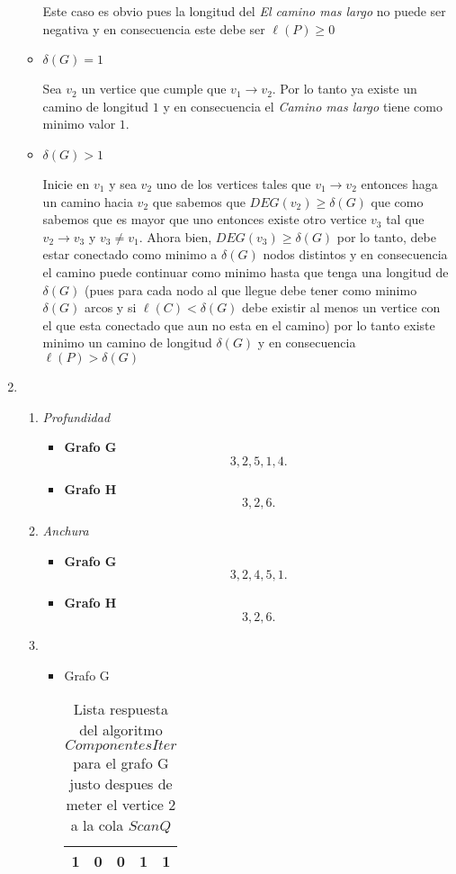 \begin{enumerate}
\begin{itemize}
	    Este caso es obvio pues la longitud del \textit{El camino mas largo} no puede ser negativa y en consecuencia este debe ser $\ell\left( P \right) \ge 0$

	  \item $\delta\left( G \right)=1 $

	    Sea $v_2$ un vertice que cumple que $v_1\to v_2$. Por lo tanto ya existe un camino de longitud $1$ y en consecuencia el \textit{Camino mas largo} tiene como minimo valor $1$.

	  \item $\delta\left( G \right) > 1$

	    Inicie en $v_1$ y sea $v_2$ uno de los vertices tales que $v_1\to v_2$ entonces haga un camino hacia $v_2$ que sabemos que $DEG\left( v_2 \right) \ge \delta\left( G \right) $ que como sabemos que es mayor que uno entonces existe otro vertice $v_3$ tal que $v_2\to v_3$ y $v_3\neq v_1$. Ahora bien,  $DEG(v_3) \ge \delta\left( G \right) $ por lo tanto, debe estar conectado como minimo a $\delta\left( G \right) $ nodos distintos y en consecuencia el camino puede continuar como minimo hasta que tenga una longitud de $\delta\left( G \right) $ (pues para cada nodo al que llegue debe tener como minimo $\delta\left( G \right) $ arcos y si $\ell \left( C \right) < \delta\left( G \right) $ debe existir al menos un vertice con el que esta conectado que aun no esta en el camino) por lo tanto existe minimo un camino de longitud $\delta\left( G \right) $ y en consecuencia $\ell \left( P \right) > \delta\left( G \right) $
	\end{itemize}
      \item 
	\begin{enumerate}
	  \item \textit{Profundidad}

	    \begin{itemize}
	      \item \textbf{Grafo G} \[
	      3,2,5,1,4
	      .\] 
	    \item \textbf{Grafo H} \[
	    3,2,6
	    .\] 
	    \end{itemize}
	    
	  \item \textit{Anchura}
	    \begin{itemize}
	      \item \textbf{Grafo G} \[
	      3,2,4,5,1
	      .\] 
	    \item \textbf{Grafo H} \[
	    3,2,6
	    .\] 
	    \end{itemize}
	  \item 
	    \begin{itemize}
	      \item Grafo G
		\begin{table}[H]
		  \centering
		  \caption{Lista respuesta del algoritmo $ComponentesIter$ para el grafo G justo despues de meter el vertice $2$ a la cola $ScanQ$}
		  \label{tab:label}
		  \begin{tabular}{|c|c|c|c|c|}
		  \hline
		  1 & 0 & 0 & 1 & 1 \\
		  \hline
		  \end{tabular}
		\end{table}


\end{itemize}
\end{enumerate}
\end{enumerate}
